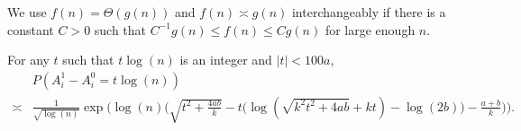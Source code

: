 \documentclass{article}
\begin{document}
We use $f(n)=\Theta(g(n))$ and $f(n)\asymp g(n)$ interchangeably if there is a constant $C>0$ such that $C^{-1}g(n)\le f(n)\le C g(n)$ for large enough $n$.

\begin{proposition}  \label{prop:99}
For any $t$ such that $t\log(n)$ is an integer and $|t|<100a$,
\begin{equation} \label{eq:ly}
\begin{aligned}
& P(A^1_i-A^0_i = t\log(n))  \\
\asymp & \frac{1} {\sqrt{\log(n)}} \exp\Big(\log(n)
\Big(\sqrt{t^2+\frac{4ab}{k}} -t\big(\log(\sqrt{k^2t^2+4ab}+kt)-\log(2b) \big) -\frac{a+b}{k}  \Big)\Big) .
\end{aligned}
\end{equation}
\end{proposition}
\end{document}
